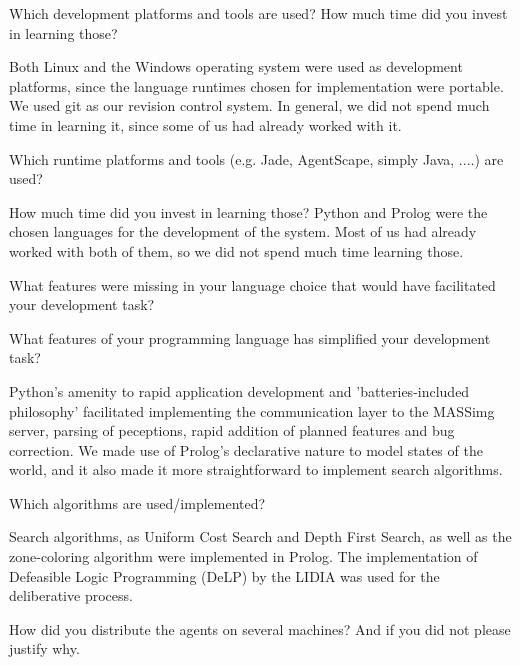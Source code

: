 \begin{question}
Which development platforms and tools are used? How much time did you
invest in learning those?  
\end{question}

Both Linux and the Windows operating system were
used as development platforms, since the language runtimes chosen for
implementation were portable.  We used git as our revision control system. In
general, we did not spend much time in learning it, since some of us had
already worked with it.

\begin{question}
Which runtime platforms and tools (e.g. Jade, AgentScape, simply Java,
....) are used? 
\end{question}

How much time did you invest in learning those?  Python and
Prolog were the chosen languages for the development of the system. Most of us
had already worked with both of them, so we did not spend much time learning
those.

\begin{question}
What features were missing in your language choice that would have
facilitated your development task?
\end{question}

\begin{question}
What features of your programming language has simplified your development
task?  
\end{question}

Python's amenity to rapid application development and
'batteries-included philosophy' facilitated implementing the communication
layer to the MASSimg server, parsing of peceptions, rapid addition of planned
features and bug correction.  We made use of Prolog's declarative nature to
model states of the world, and it also made it more straightforward to
implement search algorithms.

\begin{question}
Which algorithms are used/implemented?  
\end{question}

Search algorithms, as Uniform Cost
Search and Depth First Search, as well as the zone-coloring algorithm were
implemented in Prolog.  The implementation of Defeasible Logic Programming
(DeLP) by the LIDIA was used for the deliberative process.

\begin{question}
How did you distribute the agents on several machines? And if you did not
please justify why.  
\end{question}

